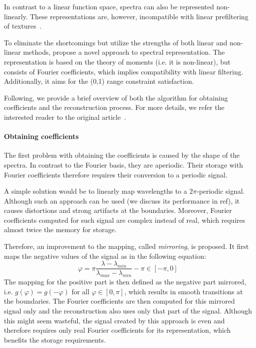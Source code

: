 In contrast to a linear function space, spectra can also be represented non-linearly. These representations are, however, incompatible with linear prefiltering of textures~\cite{trigonometricMomentsPaper}.

To eliminate the shortcomings but utilize the strengths of both linear and non-linear methods, \citet{trigonometricMomentsPaper} propose a novel approach to spectral representation. The representation is based on the theory of moments (i.e. it is non-linear), but consists of Fourier coefficients, which implies compatibility with linear filtering. Additionally, it aims for the (0,1) range constraint satisfaction.

Following, we provide a brief overview of both the algorithm for obtaining coefficients and the reconstruction process. For more details, we refer the interested reader to the original article~\cite{trigonometricMomentsPaper}.

\paragraph{Obtaining coefficients} \label{par:spectrumToCoefficientConversion}

The first problem with obtaining the coefficients is caused by the shape of the spectra. In contrast to the Fourier basis, they are aperiodic. Their storage with Fourier coefficients therefore requires their conversion to a periodic signal.

A simple solution would be to linearly map wavelengths to a $2\pi$-periodic signal. Although such an approach can be used (we discuss its performance in ref), it causes distortions and strong artifacts at the boundaries. Moreover, Fourier coefficients computed for such signal are complex instead of real, which requires almost twice the memory for storage.

Therefore, an improvement to the mapping, called \emph{mirroring}, is proposed. It first maps the negative values of the signal as in the following equation:
\begin{equation} \label{wavelengthPhaseMapping}
\varphi =\pi \dfrac{\lambda - \lambda_{min}}{\lambda_{max} - \lambda_{min}} - \pi\in[-\pi, 0]
\end{equation}
The mapping for the positive part is then defined as the negative part mirrored, i.e. $g(\varphi) = g(-\varphi)$ for all $\varphi\in[0,\pi]$, which results in smooth transitions at the boundaries. The Fourier coefficients are then computed for this mirrored signal only and the reconstruction also uses only that part of the signal. Although this might seem wasteful, the signal created by this approach is even and therefore requires only real Fourier coefficients for its representation, which benefits the storage requirements.

